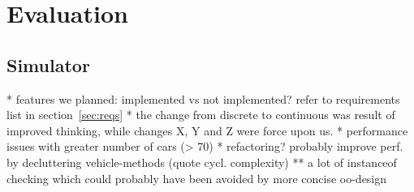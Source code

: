 \section{Evaluation}
\subsection{Simulator}
* features we planned: implemented vs not implemented? refer to requirements list in section~\ref{sec:reqs}
* the change from discrete to continuous was result of improved thinking, while changes X, Y and Z were force upon us. 
* performance issues with greater number of cars (> 70)
* refactoring? probably improve perf. by decluttering vehicle-methods (quote cycl. complexity)
** a lot of instanceof checking which could probably have been avoided by more concise oo-design